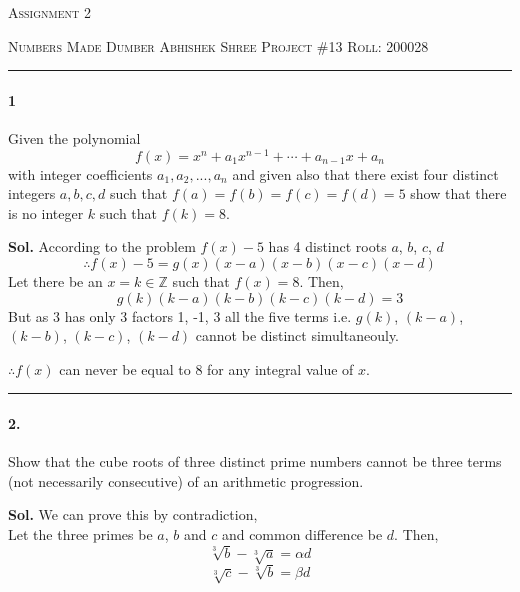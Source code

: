 \documentclass[12pt,oneside,reqno]{amsart}
\begin{document}
\thispagestyle{empty}
\begin{center}
    
    {\scshape \large  Assignment 2}
\end{center}
{\scshape Numbers Made Dumber} \hfill 
\hfill {\scshape Abhishek Shree}
\linebreak
{\scshape Project \#13}  \hfill {\scshape Roll: 200028}


\smallskip

\hrule

\bigskip
\paragraph*{1} Given the polynomial
$$ f(x) = x^n + a_1x^{n-1} + \dotsm + a_{n-1}x + a_n $$
with integer coefficients $a_1, a_2, ... , a_n$ and given also that there exist four distinct integers
$a, b, c, d$ such that
$f(a) = f(b) = f(c) = f(d) = 5$
show that there is no integer $k$ such that $f(k) = 8$.

\bigskip
\textbf{Sol.} According to the problem $f(x)-5$ has 4 distinct roots $a$, $b$, $c$, $d$
$$
    \therefore f(x)-5 = g(x)(x-a)(x-b)(x-c)(x-d)
$$
Let there be an $x=k \in \mathbb{Z}$ such that $f(x)=8$. Then,
$$
    g(k)(k-a)(k-b)(k-c)(k-d) = 3
$$
But as 3 has only 3 factors 1, -1, 3 all the five terms i.e. $g(k)$, $(k-a)$, $(k-b)$, $(k-c)$, $(k-d)$ cannot be distinct simultaneouly.

$\therefore f(x)$ can never be equal to 8 for any integral value of $x$.

\par\noindent\textcolor{gray}{\rule{\textwidth}{0.5pt}}
\smallskip

\paragraph*{2.} Show that the cube roots of three distinct prime numbers cannot be three terms (not
necessarily consecutive) of an arithmetic progression.

\bigskip
\textbf{Sol.} We can prove this by contradiction, \\
Let the three primes be $a$, $b$ and $c$ and common difference be $d$. Then,
\begin{equation}
    \sqrt[3]{b}-\sqrt[3]{a}=\alpha d
\end{equation}
\begin{equation}
    \sqrt[3]{c}-\sqrt[3]{b}=\beta d
\end{equation}
\end{document}
